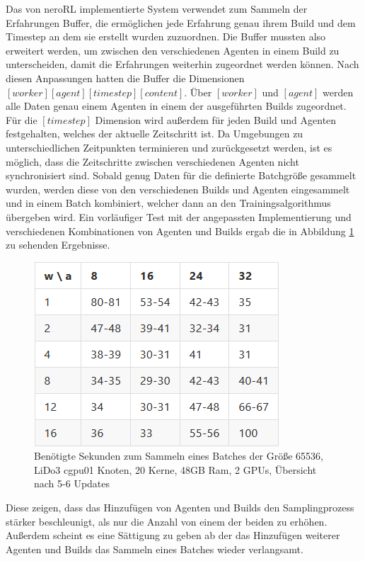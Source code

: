 Das von neroRL implementierte System verwendet zum Sammeln der Erfahrungen Buffer, die ermöglichen jede Erfahrung genau ihrem  Build und dem Timestep an dem sie erstellt wurden zuzuordnen. 
Die Buffer mussten also erweitert werden, um zwischen den verschiedenen Agenten in einem Build zu unterscheiden, damit die Erfahrungen weiterhin zugeordnet werden können. 
Nach diesen Anpassungen hatten die Buffer die Dimensionen $[worker][agent][timestep][content]$. Über $[worker]$ und $[agent]$ werden alle Daten genau einem Agenten in einem der ausgeführten Builds zugeordnet. Für die $[timestep]$ Dimension wird außerdem für jeden Build und Agenten festgehalten, welches der aktuelle Zeitschritt ist. Da Umgebungen zu unterschiedlichen Zeitpunkten terminieren und zurückgesetzt werden, ist es möglich, dass die Zeitschritte zwischen verschiedenen Agenten nicht synchronisiert sind. Sobald genug Daten für die definierte Batchgröße gesammelt wurden, werden diese von den verschiedenen Builds und Agenten eingesammelt und in einem Batch kombiniert, welcher dann an den Trainingsalgorithmus übergeben wird.
Ein vorläufiger Test mit der angepassten Implementierung und verschiedenen Kombinationen von Agenten und Builds ergab die in Abbildung \ref{fig:build-agent-time} zu sehenden Ergebnisse.
\begin{figure}
	\centering
	\includegraphics[width=0.5\linewidth]{resources/img/agent_build_time.png}
	\caption{Benötigte Sekunden zum Sammeln eines Batches der Größe 65536, LiDo3 cgpu01 Knoten, 20 Kerne, 48GB Ram, 2 GPUs, Übersicht nach 5-6 Updates}
	\label{fig:build-agent-time}
\end{figure}
Diese zeigen, dass das Hinzufügen von Agenten und Builds den Samplingprozess stärker beschleunigt, als nur die Anzahl von einem der beiden zu erhöhen. Außerdem scheint es eine Sättigung zu geben ab der das Hinzufügen weiterer Agenten und Builds das Sammeln eines Batches wieder verlangsamt.
